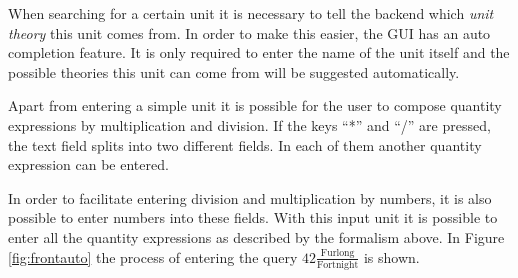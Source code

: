 When searching for a certain unit it is necessary to tell the backend which \textit{unit theory} this unit comes from. In order to make this easier, the GUI has an auto completion feature. It is only required to enter the name of the unit itself and the possible theories this unit can come from will be suggested automatically.

Apart from entering a simple unit it is possible for the user to compose quantity expressions by multiplication and division. If the keys ``*'' and ``/'' are pressed, the text field splits into two different fields. In each of them another quantity expression can be entered.

In order to facilitate entering division and multiplication by numbers, it is also possible to enter numbers into these fields. With this input unit it is possible to enter all the quantity expressions as described by the formalism above. In Figure \ref{fig:frontauto} the process of entering the query $42 \frac{\text{Furlong}}{\text{Fortnight}}$ is shown.

